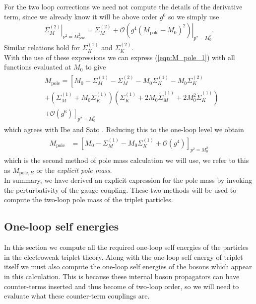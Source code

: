 \documentclass[11pt]{article}
\def\Mp{M_{\text{pole}}}
\def\Mpb{M_{\text{pole},B}}
\begin{document}
For the two loop corrections we need not compute the details of the derivative term, since we already know it will be above order $g^6$ so we simply use
\begin{align*}
\left.\Sigma^{(2)}_M\right|_{p^2=\Mp^2}=\left.\Sigma^{(2)}_M+\mathcal{O}\left(g^4(\Mp-M_0)^2\right)\right|_{p^2=M_0^2}.
\end{align*}
Similar relations hold for $\Sigma^{(1)}_K$ and $\Sigma^{(2)}_K$.\\

With the use of these expressions we can express (\ref{eqn:M_pole_1}) with all functions evaluated at $M_0$ to give
\begin{align}
\begin{split}
&\Mp=\left[M_0-\Sigma^{(1)}_M-\Sigma^{(2)}_M-M_0\Sigma^{(1)}_K-M_0\Sigma^{(2)}_K\right.\\
&+(\Sigma^{(1)}_M+M_0\Sigma^{(1)}_K)(\Sigma^{(1)}_K+2M_0\dot{\Sigma}^{(1)}_M+2M_0^2\dot{\Sigma}^{(1)}_K)\\
&\left.+\mathcal{O}\left(g^6\right)\right]_{p^2=M_0^2} \label{eqn:M_pole_explicit}
\end{split}
\end{align}
which agrees with Ibe and Sato \cite{Ibe2013a}.  Reducing this to the one-loop level we obtain
\begin{align}
\begin{split}
\Mp&=\left[M_0-\Sigma^{(1)}_M-M_0\Sigma^{(1)}_K+\mathcal{O}\left(g^4\right)\right]_{p^2=M_0^2} \label{eqn:M_pole_explicit_1_loop}
\end{split}
\end{align}
which is the second method of pole mass calculation we will use, we refer to this as $\Mpb$ or the \textit{explicit pole mass}.\\

In summary, we have derived an explicit expression for the pole mass by invoking the perturbativity of the gauge coupling.  These two methods will be used to compute the two-loop pole mass of the triplet particles.

\subsection{One-loop self energies}

In this section we compute all the required one-loop self energies of the particles in the electroweak triplet theory.  Along with the one-loop self energy of triplet itself we must also compute the one-loop self energies of the bosons which appear in this calculation.  This is because these internal boson propagators can have counter-terms inserted and thus become of two-loop order, so we will need to evaluate what these counter-term couplings are.\\
\end{document}

